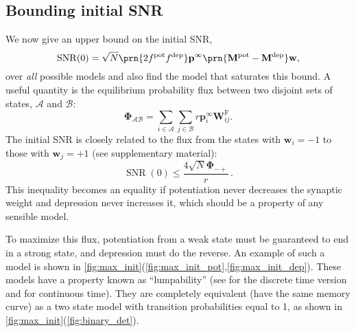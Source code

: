 \documentclass{article} %
\DeclareMathOperator{\snr}{SNR}
\newcommand{\pr}{\mathbf{p}}
\newcommand{\eq}{\pr^\infty}
\newcommand{\w}{\mathbf{w}}
\newcommand{\W}{\mathbf{W}}
\newcommand{\M}{\mathbf{M}}
\newcommand{\frg}{\W^{\mathrm{F}}}
\newcommand{\F}{\boldsymbol{\Phi}}
\newcommand{\pot}{^{\text{pot}}}
\newcommand{\dep}{^{\text{dep}}}
\newcommand{\CA}{\mathcal{A}}
\newcommand{\CB}{\mathcal{B}}
\begin{document}
\subsection{Bounding initial SNR}\label{sec:initial}

We now give an upper bound on the initial SNR,
%
\begin{equation}\label{eq:init}
  \snr(0) = \sqrt{N}\prn{2 f\pot f\dep} \eq \prn{\M\pot-\M\dep} \w,
\end{equation}
%
over \emph{all} possible models and also find the model that saturates this bound.
A useful quantity is the equilibrium probability flux between two disjoint sets of states, $\CA$ and $\CB$:
%
\begin{equation}\label{eq:flux}
  \F_{\CA\CB} = \sum_{i\in\CA} \sum_{j\in\CB} r \eq_i \frg_{ij}.
\end{equation}
%
The initial SNR is closely related to the flux from the states with $\w_i=-1$ to those with $\w_j=+1$ (see supplementary material):
%
\begin{equation}\label{eq:initflux}
  \snr(0) \leq \frac{4\sqrt{N}\F_{-+}}{r}\,.
\end{equation}
%
This inequality becomes an equality if potentiation never decreases the synaptic weight and depression never increases it, which should be a property of any sensible model.

To maximize this flux, potentiation from a weak state must be guaranteed to end in a strong state, and depression must do the reverse.
An example of such a model is shown in \autoref{fig:max_init}(\ref{fig:max_init_pot},\ref{fig:max_init_dep}).
These models have a property known as ``lumpability'' (see \cite[\S6.3]{kemeny1960finite} for the discrete time version and \cite{burke1958markovian,Ball1993Lumpability} for continuous time).
They are completely equivalent (\ie have the same memory curve) as a two state model with transition probabilities equal to 1, as shown in \autoref{fig:max_init}(\ref{fig:binary_det}).
\end{document}
